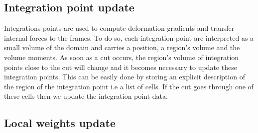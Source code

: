 \documentclass[11pt, oneside, a4paper]{memoir}
\begin{document}
\subsection{Integration point update}
\label{sec:gausspointupdate}

Integrations points are used to compute deformation gradients and transfer internal forces to the frames. To do so, each integration point are interpreted as a small volume of the domain and carries a position, a region's volume and the volume moments. As soon as a cut occurs, the region's volume of integration points close to the cut will change and it becomes necessary to update these integration points. This can be easily done by storing an explicit description of the region of the integration point i.e a list of cells. If the cut goes through one of these cells then we update the integration point data.

\subsection{Local weights update} \label{sec:interpolation}
\end{document}
